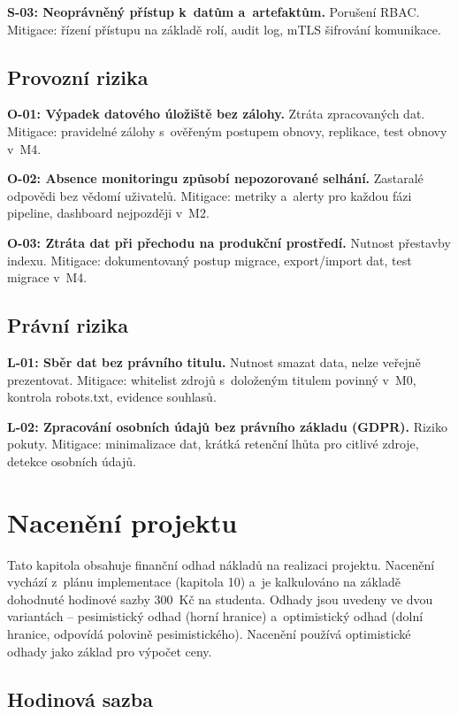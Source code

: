\documentclass[a4paper, 11pt]{article}
\begin{document}
\textbf{S-03: Neoprávněný přístup k~datům a~artefaktům.} Porušení RBAC. Mitigace: řízení přístupu na základě rolí, audit log, mTLS šifrování komunikace.

\subsection{Provozní rizika}

\textbf{O-01: Výpadek datového úložiště bez zálohy.} Ztráta zpracovaných dat. Mitigace: pravidelné zálohy s~ověřeným postupem obnovy, replikace, test obnovy v~M4.

\textbf{O-02: Absence monitoringu způsobí nepozorované selhání.} Zastaralé odpovědi bez vědomí uživatelů. Mitigace: metriky a~alerty pro každou fázi pipeline, dashboard nejpozději v~M2.

\textbf{O-03: Ztráta dat při přechodu na produkční prostředí.} Nutnost přestavby indexu. Mitigace: dokumentovaný postup migrace, export/import dat, test migrace v~M4.

\subsection{Právní rizika}

\textbf{L-01: Sběr dat bez právního titulu.} Nutnost smazat data, nelze veřejně prezentovat. Mitigace: whitelist zdrojů s~doloženým titulem povinný v~M0, kontrola robots.txt, evidence souhlasů.

\textbf{L-02: Zpracování osobních údajů bez právního základu (GDPR).} Riziko pokuty. Mitigace: minimalizace dat, krátká retenční lhůta pro citlivé zdroje, detekce osobních údajů.

\newpage
\section{Nacenění projektu}

Tato kapitola obsahuje finanční odhad nákladů na realizaci projektu. Nacenění vychází z~plánu implementace (kapitola 10) a~je kalkulováno na základě dohodnuté hodinové sazby 300~Kč na studenta. Odhady jsou uvedeny ve dvou variantách -- pesimistický odhad (horní hranice) a~optimistický odhad (dolní hranice, odpovídá polovině pesimistického). Nacenění používá optimistické odhady jako základ pro výpočet ceny.

\subsection{Hodinová sazba}
\end{document}

